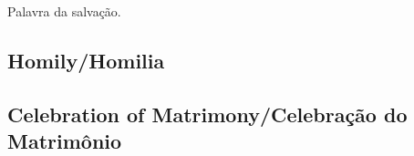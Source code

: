 \documentclass[10pt,a5]{article}
\begin{document}
\begin{paracol}{2}
{Palavra da salva\c{c}\~ao.}\\


 \switchcolumn*

\end{paracol}

\begin{center}
	\subsection*{Homily/Homilia}
	\subsection*{Celebration of Matrimony/Celebra\c{c}\~ao do Matrim\^onio}
\end{center}
\vspace{1em}
\end{document}
